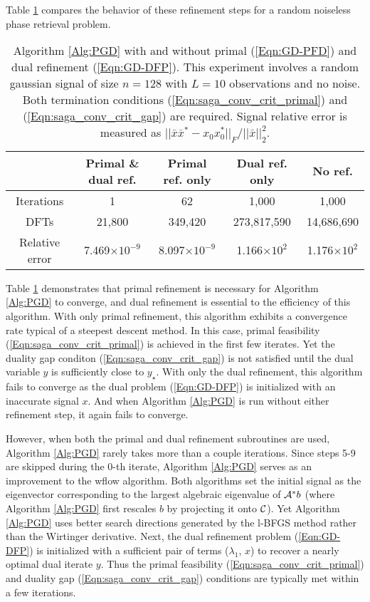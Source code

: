 \begin{enumerate}
Table \ref{Tab:noiseless_runtimes} compares the behavior of these refinement steps for a random noiseless phase retrieval problem.

\begin{table}[H]
\centering
\begin{tabular}{ |c|c|c|c|c| }
 \hline
	& Primal \& dual ref.
 			& Primal ref. only  &	Dual ref. only & No ref. \\
 \hline
 Iterations 		& 1	&  62 	&	1,000	&  1,000	\\
 DFTs 	& 21,800 	& 349,420 &	 273,817,590 	&  14,686,690	\\
 Relative error & 	7.469$\times 10^{-9}$		&	8.097$\times 10^{-9}$ &	1.166$\times 10^{2}$	& 	 1.176$\times 10^{2}$	\\
 \hline
\end{tabular}
\caption{Algorithm \ref{Alg:PGD} with and without primal (\ref{Eqn:GD-PFD}) and dual refinement (\ref{Eqn:GD-DFP}). This experiment involves a random gaussian signal of size $n = 128$ with $L = 10$ observations and no noise.  Both termination conditions (\ref{Eqn:saga_conv_crit_primal}) and (\ref{Eqn:saga_conv_crit_gap}) are required.  Signal relative error is measured as $|| \bar{x}\bar{x}^* - x_0x_0^* ||_F / ||\bar{x}||_2^2$.} \label{Tab:noiseless_runtimes}
\end{table}


Table \ref{Tab:noiseless_runtimes} demonstrates that primal refinement is necessary for Algorithm \ref{Alg:PGD} to converge, and dual refinement is essential to the efficiency of this algorithm.  With only primal refinement, this algorithm exhibits a convergence rate typical of a steepest descent method.   In this case, primal feasibility (\ref{Eqn:saga_conv_crit_primal}) is achieved in the first few iterates.  Yet the duality gap conditon (\ref{Eqn:saga_conv_crit_gap}) is not satisfied until the dual variable $y$ is sufficiently close to $y_\star$.  With only the dual refinement, this algorithm fails to converge as the dual problem (\ref{Eqn:GD-DFP}) is initialized with an inaccurate signal $x$.  And when Algorithm \ref{Alg:PGD} is run without either refinement step, it again fails to converge.  


However, when both the primal and dual refinement subroutines are used, Algorithm \ref{Alg:PGD} rarely takes more than a couple iterations.  Since steps 5-9 are skipped during the $0$-th iterate, Algorithm \ref{Alg:PGD} serves as an improvement to the wflow algorithm.  Both algorithms set the initial signal as the eigenvector corresponding to the largest algebraic eigenvalue of ${\mathcal A}^*b$ (where Algorithm \ref{Alg:PGD} first rescales $b$ by projecting it onto ${\mathcal C}$).  Yet Algorithm \ref{Alg:PGD} uses better search directions generated by the l-BFGS method rather than the Wirtinger derivative.  Next, the dual refinement problem (\ref{Eqn:GD-DFP}) is initialized with a sufficient pair of terms ($\lambda_1$, $x$) to recover a nearly optimal dual iterate $y$.  Thus the primal feasibility (\ref{Eqn:saga_conv_crit_primal}) and duality gap (\ref{Eqn:saga_conv_crit_gap}) conditions are typically met within a few iterations.  




\end{enumerate}
